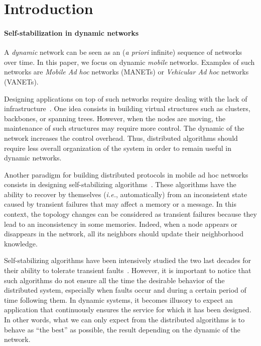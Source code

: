 \documentclass[11pt,english]{article}
\newcommand{\Latin}[1]{\textit{#1}}
\newcommand{\ie}{\Latin{i.e.},\xspace}
\begin{document}
\section{Introduction}

\paragraph{Self-stabilization in dynamic networks}
A \emph{dynamic} network can be seen as an (\emph{a priori} infinite) sequence
of networks over time. In this paper, we focus on dynamic \emph{mobile}
networks. Examples of such networks are \emph{Mobile Ad hoc} networks (MANETs) or
\emph{Vehicular Ad hoc} networks (VANETs).

Designing applications on top of such networks require dealing with the lack of
infrastructure~\cite{S02,DBLP:conf/icdcit/JhumkaK07}. One idea consists in building virtual structures such as clusters, backbones,
or spanning trees.
However, when the nodes are moving, the maintenance of such structures may
require more control.
The dynamic of the network increases the control overhead.
Thus, distributed algorithms should require less overall organization of the
system in order to remain useful in dynamic networks.

Another paradigm for building distributed protocols in mobile ad hoc networks
consists in designing self-stabilizing algorithms~\cite{BDHY07}. These
algorithms have the ability to recover by themselves (\ie automatically) from an 
inconsistent state caused by transient failures that may affect a memory or a message. 
In this context, the topology changes can be considered as transient failures because 
they lead to an inconsistency in some memories. Indeed, when a node appears or disappears in the
network, all its neighbors should update their neighborhood knowledge.

Self-stabilizing algorithms have been intensively studied the two last decades
for their ability to tolerate transient faults~\cite{D00}.
However, it is important to notice that such algorithms do not ensure all the time
the desirable behavior of the distributed system,
especially when faults occur and during a certain period of time following them. 
In dynamic systems, it becomes illusory to expect an application that continuously 
ensures the service for which it has been designed.
In other words, what we can only expect from the distributed algorithms is to
behave as ``the best'' as possible, the result depending on the dynamic of the
network.
\end{document}
